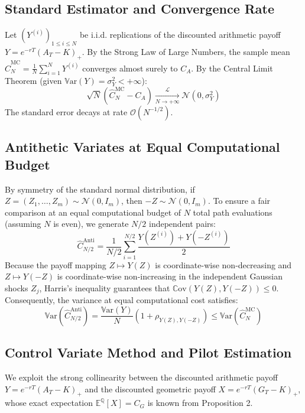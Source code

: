 \documentclass[11pt,a4paper]{article}
\newcommand{\E}{\mathbb{E}}
\newcommand{\Q}{\mathbb{Q}}
\newcommand{\Var}{\mathbb{V}\text{ar}}
\newcommand{\Cov}{\mathbb{C}\text{ov}}
\begin{document}
\subsection{Standard Estimator and Convergence Rate}
Let $(Y^{(i)})_{1 \le i \le N}$ be i.i.d. replications of the discounted arithmetic payoff $Y = e^{-rT}(A_T - K)_+$. By the Strong Law of Large Numbers, the sample mean $\hat{C}_N^{\text{MC}} = \frac{1}{N} \sum_{i=1}^N Y^{(i)}$ converges almost surely to $C_A$. By the Central Limit Theorem (given $\Var(Y) = \sigma_Y^2 < +\infty$):
\begin{equation}
    \sqrt{N} \left( \hat{C}_N^{\text{MC}} - C_A \right) \underset{N \to +\infty}{\overset{\mathcal{L}}{\longrightarrow}} \mathcal{N}(0, \sigma_Y^2)
\end{equation}
The standard error decays at rate $\mathcal{O}(N^{-1/2})$.

\subsection{Antithetic Variates at Equal Computational Budget}
By symmetry of the standard normal distribution, if $Z = (Z_1, \dots, Z_m) \sim \mathcal{N}(0, I_m)$, then $-Z \sim \mathcal{N}(0, I_m)$. To ensure a fair comparison at an equal computational budget of $N$ total path evaluations (assuming $N$ is even), we generate $N/2$ independent pairs:
\begin{equation}
    \hat{C}_{N/2}^{\text{Anti}} = \frac{1}{N/2} \sum_{i=1}^{N/2} \frac{Y(Z^{(i)}) + Y(-Z^{(i)})}{2}
\end{equation}
Because the payoff mapping $Z \mapsto Y(Z)$ is coordinate-wise non-decreasing and $Z \mapsto Y(-Z)$ is coordinate-wise non-increasing in the independent Gaussian shocks $Z_j$, Harris's inequality guarantees that $\Cov(Y(Z), Y(-Z)) \le 0$. Consequently, the variance at equal computational cost satisfies:
\begin{equation}
    \Var\left(\hat{C}_{N/2}^{\text{Anti}}\right) = \frac{\Var(Y)}{N} \left( 1 + \rho_{Y(Z), Y(-Z)} \right) \le \Var\left(\hat{C}_N^{\text{MC}}\right)
\end{equation}

\subsection{Control Variate Method and Pilot Estimation}
We exploit the strong collinearity between the discounted arithmetic payoff $Y = e^{-rT}(A_T - K)_+$ and the discounted geometric payoff $X = e^{-rT}(G_T - K)_+$, whose exact expectation $\E^\Q[X] = C_G$ is known from Proposition 2.
\end{document}
